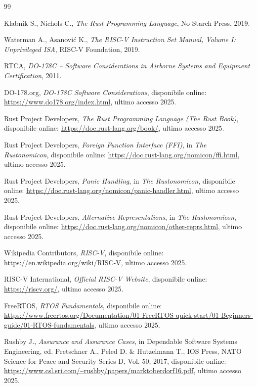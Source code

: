 \documentclass[italian, Lau, oneside]{sapthesis} %
\begin{document}
\begin{thebibliography}{99}

Klabnik S., Nichols C., \textit{The Rust Programming Language}, No Starch Press, 2019.

Waterman A., Asanović K., \textit{The RISC-V Instruction Set Manual, Volume I: Unprivileged ISA}, RISC-V Foundation, 2019.

RTCA, \textit{DO-178C – Software Considerations in Airborne Systems and Equipment Certification}, 2011.

DO-178.org, \textit{DO-178C Software Considerations}, disponibile online: \url{https://www.do178.org/index.html}, ultimo accesso 2025.

Rust Project Developers, \textit{The Rust Programming Language (The Rust Book)}, disponibile online: \url{https://doc.rust-lang.org/book/}, ultimo accesso 2025.

Rust Project Developers, \textit{Foreign Function Interface (FFI)}, in \textit{The Rustonomicon}, disponibile online: \url{https://doc.rust-lang.org/nomicon/ffi.html}, ultimo accesso 2025.

Rust Project Developers, \textit{Panic Handling}, in \textit{The Rustonomicon}, disponibile online: \url{https://doc.rust-lang.org/nomicon/panic-handler.html}, ultimo accesso 2025.

Rust Project Developers, \textit{Alternative Representations}, in \textit{The Rustonomicon}, disponibile online: \url{https://doc.rust-lang.org/nomicon/other-reprs.html}, ultimo accesso 2025.

Wikipedia Contributors, \textit{RISC-V}, disponibile online: \url{https://en.wikipedia.org/wiki/RISC-V}, ultimo accesso 2025.

RISC-V International, \textit{Official RISC-V Website}, disponibile online: \url{https://riscv.org/}, ultimo accesso 2025.

FreeRTOS, \textit{RTOS Fundamentals}, disponibile online: \url{https://www.freertos.org/Documentation/01-FreeRTOS-quick-start/01-Beginners-guide/01-RTOS-fundamentals}, ultimo accesso 2025.

Rushby J., \textit{Assurance and Assurance Cases}, in Dependable Software Systems Engineering, ed. Pretschner A., Peled D. \& Hutzelmann T., IOS Press, NATO Science for Peace and Security Series D, Vol. 50, 2017, disponibile online: \url{https://www.csl.sri.com/~rushby/papers/marktoberdorf16.pdf}, ultimo accesso 2025.


\end{thebibliography}
\end{document}
